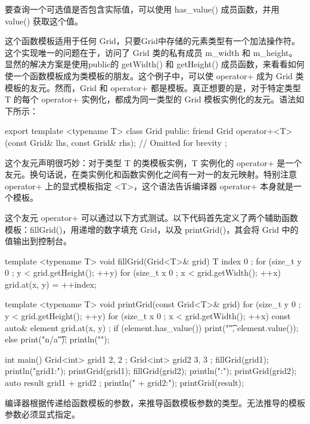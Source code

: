 要查询一个可选值是否包含实际值，可以使用 has\_value() 成员函数，并用 value() 获取这个值。

这个函数模板适用于任何 Grid，只要Grid中存储的元素类型有一个加法操作符。这个实现唯一的问题在于，访问了 Grid 类的私有成员 m\_width 和 m\_height。显然的解决方案是使用public的 getWidth() 和 getHeight() 成员函数，来看看如何使一个函数模板成为类模板的朋友。这个例子中，可以使 operator+ 成为 Grid 类模板的友元。然而，Grid 和 operator+ 都是模板。真正想要的是，对于特定类型 T 的每个 operator+ 实例化，都成为同一类型的 Grid 模板实例化的友元。语法如下所示：

\begin{cpp}
export template <typename T>
class Grid
{
    public:
        friend Grid operator+<T>(const Grid& lhs, const Grid& rhs);
        // Omitted for brevity
};
\end{cpp}

这个友元声明很巧妙：对于类型 T 的类模板实例，T 实例化的 operator+ 是一个友元。换句话说，在类实例化和函数实例化之间有一对一的友元映射。特别注意 operator+ 上的显式模板指定 <T>，这个语法告诉编译器 operator+ 本身就是一个模板。

这个友元 operator+ 可以通过以下方式测试。以下代码首先定义了两个辅助函数模板：fillGrid()，用递增的数字填充 Grid，以及 printGrid()，其会将 Grid 中的值输出到控制台。


\begin{cpp}
template <typename T> void fillGrid(Grid<T>& grid)
{
    T index { 0 };
    for (size_t y { 0 }; y < grid.getHeight(); ++y) {
        for (size_t x { 0 }; x < grid.getWidth(); ++x) {
            grid.at(x, y) = ++index;
        }
    }
}

template <typename T> void printGrid(const Grid<T>& grid)
{
    for (size_t y { 0 }; y < grid.getHeight(); ++y) {
        for (size_t x { 0 }; x < grid.getWidth(); ++x) {
            const auto& element { grid.at(x, y) };
            if (element.has_value()) { print("{}\t", element.value()); }
            else { print("n/a\t"); }
        }
        println("");
    }
}

int main()
{
    Grid<int> grid1 { 2, 2 };
    Grid<int> grid2 { 3, 3 };
    fillGrid(grid1); println("grid1:"); printGrid(grid1);
    fillGrid(grid2); println(":"); printGrid(grid2);
    auto result { grid1 + grid2 };
    println(" + grid2:"); printGrid(result);
}
\end{cpp}


编译器根据传递给函数模板的参数，来推导函数模板参数的类型。无法推导的模板参数必须显式指定。

